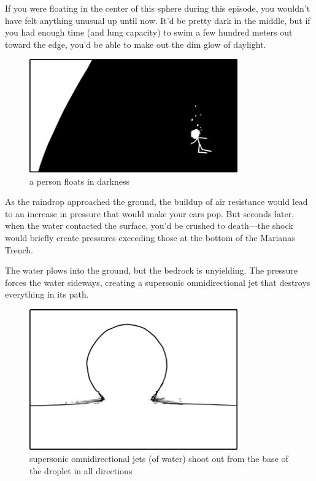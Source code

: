 {If you were floating in the center of this sphere during this episode, you wouldn’t have felt anything unusual up until now. It’d be pretty dark in the middle, but if you had enough time (and lung capacity) to swim a few hundred meters out toward the edge, you’d be able to make out the dim glow of daylight.}

\begin{figure}[!htbp]
\centering
\includegraphics[scale=0.5, max width=0.8\textwidth]{imgs/a/12/raindrop_floating.png}
\caption{a person floats in darkness}
\end{figure}

{As the raindrop approached the ground, the buildup of air resistance would lead to an increase in pressure that would make your ears pop. But seconds later, when the water contacted the surface, you’d be crushed to death—the shock would briefly create pressures exceeding those at the bottom of the Marianas Trench.}

{The water plows into the ground, but the bedrock is unyielding. The pressure forces the water sideways, creating a supersonic omnidirectional jet that destroys everything in its path.}

\begin{figure}[!htbp]
\centering
\includegraphics[scale=0.5, max width=0.8\textwidth]{imgs/a/12/raindrop_jets.png}
\caption{supersonic omnidirectional jets (of water) shoot out from the base of the droplet in all directions}
\end{figure}

